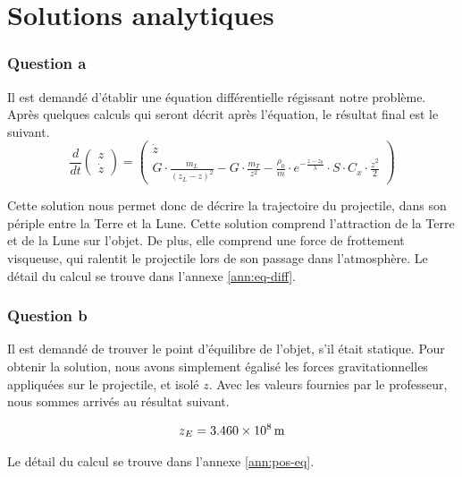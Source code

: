 \documentclass[a4paper,12pt,twoside]{article}
\begin{document}
\section{Solutions analytiques}
\subsubsection*{Question a}
Il est demandé d'établir une équation différentielle régissant notre problème.
Après quelques calculs qui seront décrit après l'équation, le résultat final est le suivant.
\begin{equation}
    \frac{d}{dt}
    \begin{pmatrix}
        z \\
        \dot{z}
    \end{pmatrix}
    =
    \begin{pmatrix}
    \dot{z} \\
    G\cdot\frac{m_L}{(z_L - z)^2} - G\cdot\frac{m_T}{z^2} - \frac{\rho_0}{m}\cdot e^{-\frac{z-z_0}{\lambda}}\cdot S\cdot C_x\cdot \frac{\dot{z}^2}{2}
    \end{pmatrix}
    \label{eq:sol}
\end{equation}

Cette solution nous permet donc de décrire la trajectoire du projectile, dans son périple entre la Terre et la Lune.
Cette solution comprend l'attraction de la Terre et de la Lune sur l'objet.
De plus, elle comprend une force de frottement visqueuse, qui ralentit le projectile lors de son passage dans l'atmosphère.
Le détail du calcul se trouve dans l'annexe \ref{ann:eq-diff}.\\

\subsubsection*{Question b}
Il est demandé de trouver le point d'équilibre de l'objet, s'il était statique.
Pour obtenir la solution, nous avons simplement égalisé les forces gravitationnelles appliquées sur le projectile, et isolé $z$.
Avec les valeurs fournies par le professeur, nous sommes arrivés au résultat suivant.

\begin{equation}
    z_E = \SI{3.460d8}{\meter}
    \label{val:zE}
\end{equation}

Le détail du calcul se trouve dans l'annexe \ref{ann:pos-eq}.\\
\end{document}
